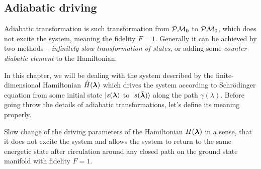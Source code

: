 \subsection{Adiabatic driving}
Adiabatic transformation is such transformation from $\mathcal{P}\mathcal{M} _0$ to $\mathcal{P}\mathcal{M}_0$, which does not excite the system, meaning the fidelity $F=1$. Generally it can be achieved by two methods -- \emph{infinitely slow transformation of states}, or adding some \emph{counter-diabatic element} to the Hamiltonian.


In this chapter, we will be dealing with the system described by the finite-dimensional Hamiltonian $\hat{H}({\bm\lambda})$ which drives the system according to Schr\"odinger equation from some initial state $\ket{s({\bm\lambda}}$ to $\ket{s(\tilde{{\bm\lambda}})}$ along the path $\gamma(\lambda)$. Before going throw the details of adiabatic transformations, let's define its meaning properly.

\begin{definition}[Adibaticity]
    Slow change of the driving parameters of the Hamiltonian $H({\bm\lambda})$ in a sense, that it does not excite the system and allows the system to return to the same energetic state after circulation around any closed path on the ground state manifold with fidelity $F=1$. 
\end{definition}


